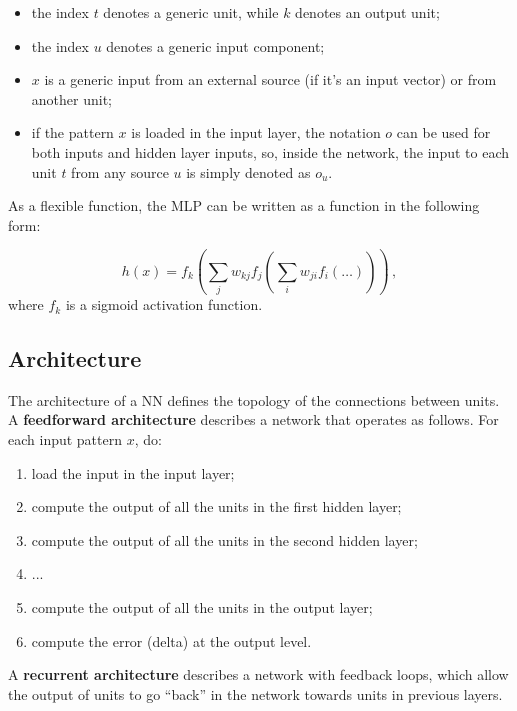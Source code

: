 \begin{itemize}
    \item the index $t$ denotes a generic unit, while $k$ denotes an output unit;

    \item the index $u$ denotes a generic input component;

    \item $x$ is a generic input from an external source (if it's an input vector) or from another unit;

    \item if the pattern $x$ is loaded in the input layer, the notation $o$ can be used for both inputs and hidden layer inputs, so, inside the network, the input to each unit $t$ from any source $u$ is simply denoted as $o_u$.
\end{itemize}
As a flexible function, the MLP can be written as a function in the following form:

\begin{equation*}
    h(x) = f_k(\sum_j w_{kj} f_j (\sum_i w_{ji} f_i(\dots))) \, ,
\end{equation*}
where $f_k$ is a sigmoid activation function.

\subsection{Architecture}

The architecture of a NN defines the topology of the connections between units. A \textbf{feedforward architecture} describes a network that operates as follows. For each input pattern $x$, do:

\begin{enumerate}
    \item load the input in the input layer;
    \item compute the output of all the units in the first hidden layer;
    \item compute the output of all the units in the second hidden layer;
    \item ...
    \item compute the output of all the units in the output layer;
    \item compute the error (delta) at the output level.
\end{enumerate}
A \textbf{recurrent architecture} describes a network with feedback loops, which allow the output of units to go ``back'' in the network towards units in previous layers.

